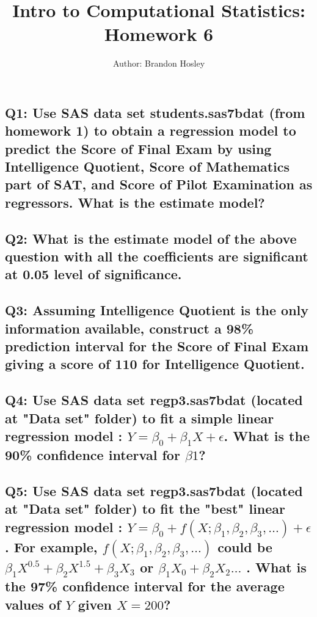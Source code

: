 \documentclass[a4paper,man,natbib]{apa6}
\title{Intro to Computational Statistics: Homework 6}
\author{Author: Brandon Hosley}
\affiliation{Instructor: Liang Kong, Ph.D}
\begin{document}
\maketitle
\singlespacing
	
\subsection*{Q1: Use SAS data set students.sas7bdat (from homework 1) to obtain a regression model to predict the Score of Final Exam by using Intelligence Quotient, Score of Mathematics part of SAT, and Score of Pilot Examination as regressors. What is the estimate model? }
% 

\subsection*{Q2: What is the estimate model of the above question with all the coefficients are significant at 0.05 level of significance. }
% 

\subsection*{Q3: Assuming Intelligence Quotient is the only information available, construct a 98\% prediction interval for the Score of Final Exam giving a score of 110 for Intelligence Quotient. }
% 

\subsection*{Q4: Use SAS data set regp3.sas7bdat (located at "Data set" folder) to fit a simple linear regression model : $Y = \beta_0 + \beta_1X + \epsilon$. What is the 90\% confidence interval for $\beta1$?
 }
% 


\subsection*{Q5: Use SAS data set regp3.sas7bdat (located at "Data set" folder) to fit the "best" linear regression model : $Y = \beta_0 + f(X; \beta_1, \beta_2, \beta_3, \ldots) + \epsilon$. For example, $f(X; \beta_1, \beta_2, \beta_3, \ldots)$ could be $\beta_1X^{0.5} + \beta_2 X^{1.5} + \beta_3 X_3$ or $\beta_1X_0 + \beta_2 X_2 \ldots$ . What is the 97\% confidence interval for the average values of $Y$ given $X=200$? }
% 


%
%
\end{document}
